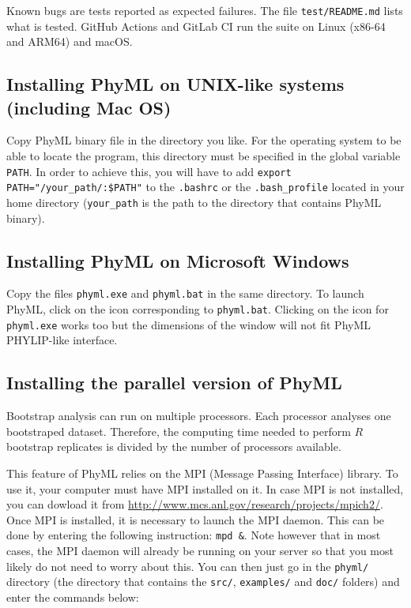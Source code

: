 \documentclass[a4paper,12pt]{article}
\newcommand{\x}[1]{\texttt{#1}}
\begin{document}
\noindent Known bugs are tests reported as expected failures. The file \x{test/README.md} lists what
is tested. GitHub Actions and GitLab CI run the suite on Linux (x86-64 and ARM64) and macOS.




\subsection{Installing PhyML on UNIX-like systems (including Mac OS)}

Copy PhyML binary file in the directory you like.  For the operating system to be able to locate the
program, this directory must be specified in the global variable \x{PATH}. In order to achieve this,
you  will   have  to  add  \x{export   PATH="/your\_path/:\${PATH}"}  to  the   \x{.bashrc}  or  the
\x{.bash\_profile} located in your home directory  (\x{your\_path} is the path to the directory that
contains PhyML binary).


\subsection{Installing PhyML on Microsoft Windows}\label{sec:install-windows}

Copy the files \x{phyml.exe} and \x{phyml.bat} in  the same directory. To launch PhyML, click on the
icon  corresponding to \x{phyml.bat}.   Clicking on  the icon  for \x{phyml.exe}  works too  but the
dimensions of the window will not fit PhyML PHYLIP-like interface.

\subsection{Installing the parallel version of PhyML}\label{sec:MPI}

Bootstrap analysis can run on multiple  processors. Each processor analyses one bootstraped dataset.
Therefore, the computing time needed to perform $R$ bootstrap replicates is divided by the number of
processors available.

This  feature of  PhyML relies  on the  MPI (Message  Passing Interface)  library. To  use  it, your
computer must  have MPI  installed on  it. In case  MPI is  not installed, you  can dowload  it from
\href{http://www.mcs.anl.gov/research/projects/mpich2/}{http://www.mcs.anl.gov/research/projects/mpich2/}.
Once MPI is  installed, it is necessary to launch  the MPI daemon. This can be  done by entering the
following instruction: \x{mpd \&}.  Note however that in most cases, the  MPI daemon will already be
running on your server so  that you most likely do not need to worry  about this. You can then just
go in the \x{phyml/} directory (the directory that contains the \x{src/}, \x{examples/} and \x{doc/}
folders) and enter the commands below:
\end{document}
